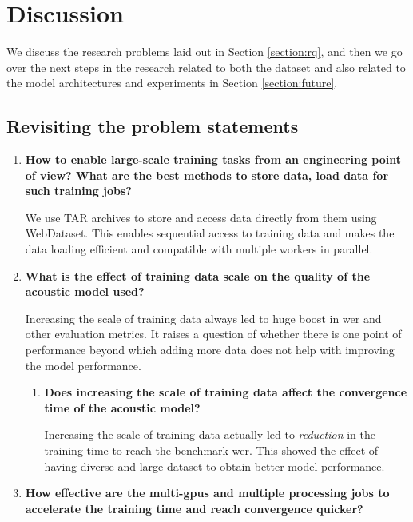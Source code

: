 \chapter{Discussion}
\label{chapter:discussion}
We discuss the research problems laid out in Section \ref{section:rq}, and then we go over the next steps in the research related to both the dataset and also related to the model architectures and experiments in Section \ref{section:future}.

\section{Revisiting the problem statements}
\label{section:ans}
\begin{enumerate}
  \item \textbf{How to enable large-scale training tasks from an engineering point of view? What are the best  methods  to  store data, load data for such training jobs?}
  
  We use TAR archives to store and access data directly from them using WebDataset. This enables sequential access to training data and makes the data loading efficient and compatible with multiple workers in parallel. 
  
  \item \textbf{What is the effect of training data scale on the quality of the acoustic model used?}
  
  Increasing the scale of training data always led to huge boost in \acrshort{wer} and other evaluation metrics. It raises a question of whether there is one point of performance beyond which adding more data does not help with improving the model performance. 
  
    \begin{enumerate}
        \item \textbf{Does increasing the scale of training data affect the convergence time of the acoustic model?}
        
        Increasing the scale of training data actually led to \emph{reduction} in the training time to reach the benchmark \acrshort{wer}. This showed the effect of having diverse and large dataset to obtain better model performance.
    \end{enumerate}
    
    
  \item \textbf{How effective are the multi-\acrshort{gpu}s and multiple processing jobs to accelerate the training time and reach convergence quicker? }
    

\end{enumerate}
